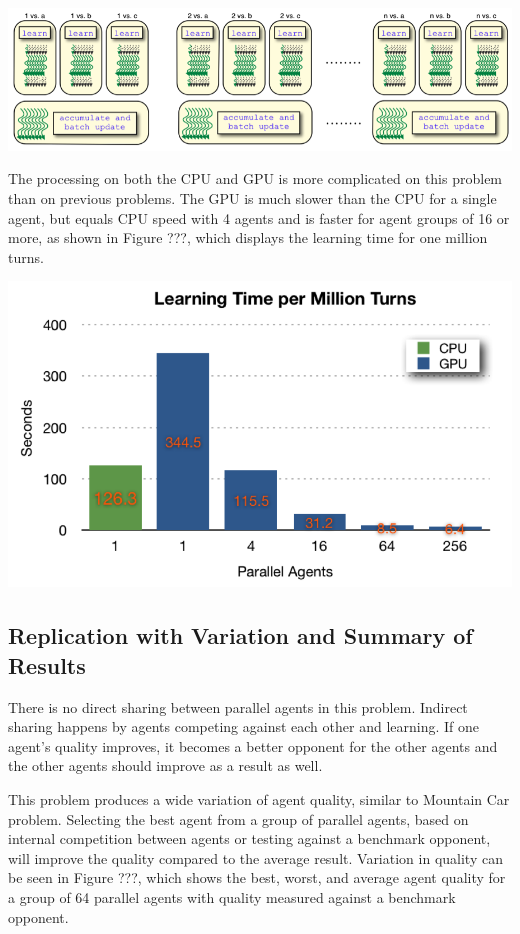 \center
\includegraphics[scale=0.8]{fig16}
\begin{flushleft}


The processing on both the CPU and GPU is more complicated on this problem than on previous problems.  The GPU is much slower than the CPU for a single agent, but equals CPU speed with 4 agents and is faster for agent groups of 16 or more, as shown in Figure ???, which displays the learning time for one million turns.

\end{flushleft}
\center
\includegraphics[scale=0.8]{fig17}
\begin{flushleft}



\subsection{Replication with Variation and Summary of Results}
There is no direct sharing between parallel agents in this problem.  Indirect sharing happens by agents competing against each other and learning.  If one agent’s quality improves, it becomes a better opponent for the other agents and the other agents should improve as a result as well.

This problem produces a wide variation of agent quality, similar to Mountain Car problem.  Selecting the best agent from a group of parallel agents, based on internal competition between agents or testing against a benchmark opponent, will improve the quality compared to the average result.  Variation in quality can be seen in Figure ???, which shows the best, worst, and average agent quality for a group of 64 parallel agents with quality measured against a benchmark opponent.

\end{flushleft}
